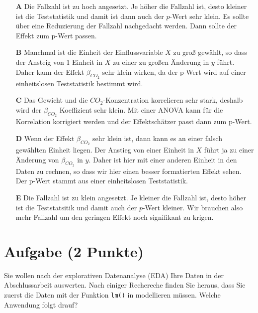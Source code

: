 \documentclass[a4paper, 9pt]{scrartcl}\usepackage[]{graphicx}\usepackage[]{xcolor}
\begin{document}
\begin{enumerate}
\item [\textbf{A} \msquare] Die Fallzahl ist zu hoch angesetzt. Je höher die Fallzahl ist, desto kleiner ist die Teststatistik und damit ist dann auch der $p$-Wert sehr klein. Es sollte über eine Reduzierung der Fallzahl nachgedacht werden. Dann sollte der Effekt zum p-Wert passen.
\item [\textbf{B} \msquare] Manchmal ist die Einheit der Einflussvariable $X$ zu groß gewählt, so dass der Ansteig von 1 Einheit in $X$ zu einer zu großen Änderung in $y$ führt. Daher kann der Effekt $\beta_{CO_2}$ sehr klein wirken, da der p-Wert wird auf einer einheitslosen Teststatistik bestimmt wird.
\item [\textbf{C} \msquare] Das Gewicht und die $CO_2$-Konzentration korrelieren sehr stark, deshalb wird der $\beta_{CO_2}$ Koeffizient sehr klein. Mit einer ANOVA kann für die Korrelation korrigiert werden und der Effektschätzer passt dann zum p-Wert.
\item [\textbf{D} \msquare] Wenn der Effekt $\beta_{CO_2}$ sehr klein ist, dann kann es an einer falsch gewählten Einheit liegen. Der Anstieg von einer Einheit in $X$ führt ja zu einer Änderung von $\beta_{CO_2}$ in $y$. Daher ist hier mit einer anderen Einheit in den Daten zu rechnen, so dass wir hier einen besser formatierten Effekt sehen. Der p-Wert stammt aus einer einheitslosen Teststatistik.
\item [\textbf{E} \msquare] Die Fallzahl ist zu klein angesetzt. Je kleiner die Fallzahl ist, desto höher ist die Teststatsitik und damit auch der $p$-Wert kleiner. Wir brauchen also mehr Fallzahl um den geringen Effekt noch signifikant zu krigen.
\end{enumerate}

\section{Aufgabe \hfill (2 Punkte)}



Sie wollen nach der explorativen Datenanalyse (EDA) Ihre Daten in der Abschlussarbeit auswerten. Nach einiger Rechereche finden Sie heraus, dass Sie zuerst die Daten mit der Funktion \texttt{lm()} in \Rlogo modellieren müssen. Welche Anwendung folgt drauf?
\end{document}
